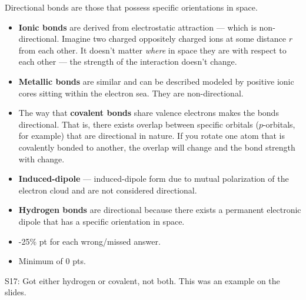 \begin{solution}

{\normalsize
Directional bonds are those that possess specific orientations in space.

\begin{itemize}
\item \textbf{Ionic bonds} are derived from electrostatic attraction --- which is non-directional. Imagine two charged oppositely charged ions at some distance $r$ from each other. It doesn't matter \emph{where} in space they are with respect to each other --- the strength of the interaction doesn't change.
\item \textbf{Metallic bonds} are similar and can be described modeled by positive ionic cores sitting within the electron sea. They are non-directional.
\item The way that \textbf{covalent bonds }share valence electrons makes the bonds directional. That is, there exists overlap between specific orbitals ($p$-orbitals, for example) that are directional in nature. If you rotate one atom that is covalently bonded to another, the overlap will change and the bond strength with change.
\item \textbf{Induced-dipole} --- induced-dipole form due to mutual polarization of the electron cloud and are not considered directional.\item \textbf{Hydrogen bonds} are directional because there exists a permanent electronic dipole that has a specific orientation in space.
\end{itemize}
}

\end{solution}

\begin{rubric}

\begin{itemize}
	\item -25\% pt for each wrong/missed answer. 
	\item Minimum of 0 pts.
\end{itemize}

\end{rubric}


S17: Got either hydrogen or covalent, not both. This was an example on the slides.

